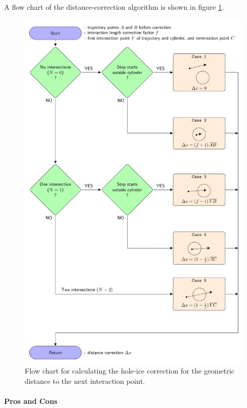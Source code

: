 A flow chart of the distance-correction algorithm is shown in figure
\ref{fig:Eeshi4Oh}.

\begin{figure}[htbp]
  \includegraphics[height=\textheight]{img/algorithm-hole-ice-correction-2017-case-ordered}
  \caption{Flow chart for calculating the hole-ice correction for the geometric distance to the next interaction point.}
  \label{fig:Eeshi4Oh}
\end{figure}

\paragraph{Pros and Cons}

